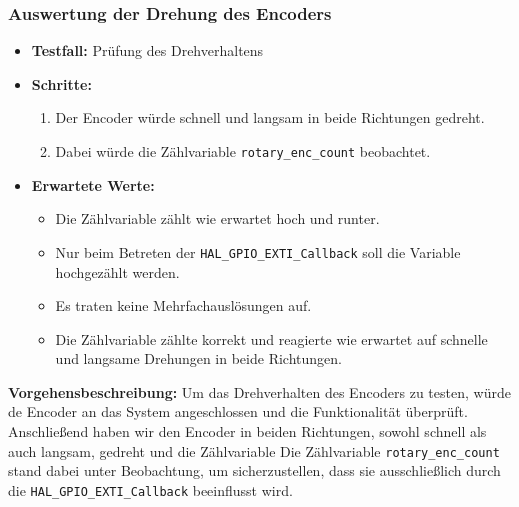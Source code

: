 \subsubsection{Auswertung der Drehung des Encoders}
\begin{itemize}
    \item \textbf{Testfall:} Prüfung des Drehverhaltens
    \item \textbf{Schritte:}
    \begin{enumerate}
        \item Der Encoder würde schnell und langsam in beide Richtungen gedreht.
        \item Dabei würde die Zählvariable \texttt{rotary\_enc\_count} beobachtet.
    \end{enumerate}
    \item \textbf{Erwartete Werte:}
    \begin{itemize}
        \item Die Zählvariable zählt wie erwartet hoch und runter.
        \item Nur beim Betreten der \texttt{HAL\_GPIO\_EXTI\_Callback} soll die Variable hochgezählt werden.
    \end{itemize}
    \begin{itemize}
        \item Es traten keine Mehrfachauslösungen auf.
        \item Die Zählvariable zählte korrekt und reagierte wie erwartet auf schnelle und langsame Drehungen in beide Richtungen.
    \end{itemize}
\end{itemize}




\textbf{Vorgehensbeschreibung:}
Um das Drehverhalten des Encoders zu testen, würde de Encoder an das System angeschlossen und die Funktionalität überprüft. Anschließend haben wir den Encoder in beiden Richtungen, sowohl schnell als auch langsam, gedreht und die Zählvariable 
Die Zählvariable \texttt{rotary\_enc\_count} stand dabei unter Beobachtung, um sicherzustellen, dass sie ausschließlich durch die \texttt{HAL\_GPIO\_EXTI\_Callback} beeinflusst wird.


